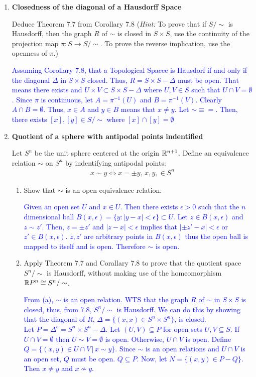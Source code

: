 \documentclass[10pt,a4paper]{report}
\newcommand{\BLUE}[1]{\textcolor{blue}{#1}}
\begin{document}
\begin{enumerate}[label=7.\arabic*.]
	\item \textbf{Closedness of the diagonal of a Hausdorff Space}
	
	Deduce Theorem 7.7 from Corollary 7.8 (\textit{Hint:} To prove that if $S/\sim$ is Hausdorff, then the graph $R$ of $\sim$ is closed in $S \times S$, use the continuity of the projection map $\pi:S \to S/\sim$.  To prove the reverse implication, use the openness of $\pi$.)
	
	\BLUE{Assuming Corollary 7.8, that a Topological Spacee is Hausdorf if and only if the diagonal $\Delta$ in $S \times S$ closed.  Thus, $R = S \times S - \Delta$ must be open.  That means there exists and $U \times V \subset S \times S - \Delta$ where $U, V \in S$ such that $U \cap V = \emptyset$.  Since $\pi$ is continuous, let $A=\pi^{-1}(U)$ and $B=\pi^{-1}(V)$.  Clearly $A \cap B = \emptyset$.  Thus, $x\in A$ and $y \in B$ means that $x\ne y$. Let $\sim \equiv =$. Then, there exists $[x], [y] \in S/\sim$ where $[x] \cap [y] = \emptyset$
	}
	
	\item \textbf{Quotient of a sphere with antipodal points indentified}
	
	Let $S^n$ be the unit sphere centered at the origin $\mathbb{R}^{n+1}$.  Define an equivalence relation $\sim$ on $S^n$ by indentifying antipodal points:
	\begin{align*}
		x \sim y \iff x=\pm y, \, x,y, \in S^n
	\end{align*}\begin{enumerate}[label=(\alph*)]
		\item Show that $\sim$ is an open equivalence relation.

		\BLUE{Given an open set $U$ and $x \in U$.  Then there exists $\epsilon > 0$ such that the $n$ dimensional ball $B(x,\epsilon)=\{y: |y -x| < \epsilon\} \subset U$.  Let $z \in B(x,\epsilon)$ and $z \sim z'$.  Then, $z = \pm z'$ and $|z -x |< \epsilon$ implies that $|\pm z'-x|< \epsilon$ or $z' \in B(x, \epsilon)$.  $z,z'$ are arbitrary points in $B(x,\epsilon)$ thus the open ball is mapped to itself and is open.  Therefore $\sim$ is open.
		}
		
		\item Apply Theorem 7.7 and Corallary 7.8 to prove that the quotient space $S^n/\sim$ is Hausdorff, without making use of the homeomorphism $\mathbb{R} P^n \cong S^n/\sim$.
		
		\BLUE{From (a), $\sim$ is an open relation.  WTS that the graph $R$ of $\sim$ in $S \times S$ is closed, thus, from 7.8, $S^n/\sim$ is Hausdorff.  We can do this by showing that the diagonal of $R$, $\Delta = \{(x,x) \in S^n \times S^n\}$, is closed.\\
		Let $P = \Delta^c = S^n \times S^n - \Delta$.  Let $(U,V) \subseteq P$ for open sets $U,V \subseteq S$.  If $U \cap V = \emptyset$ then $U \sim V = \emptyset$ is open. Otherwise, $U \cap V$ is open.  Define $Q=\{ (x,y) \in U \cap V\,|\,x\sim y\}$.  Since $\sim$ is an open relations and $U \cap V$ is an open set, $Q$ must be open. $Q \subseteq P$.  Now, let $N = \{(x,y) \in P - Q\}$.  Then $x \ne y$ and $x \nsim y$.
		}
		

\end{enumerate}
\end{enumerate}
\end{document}
